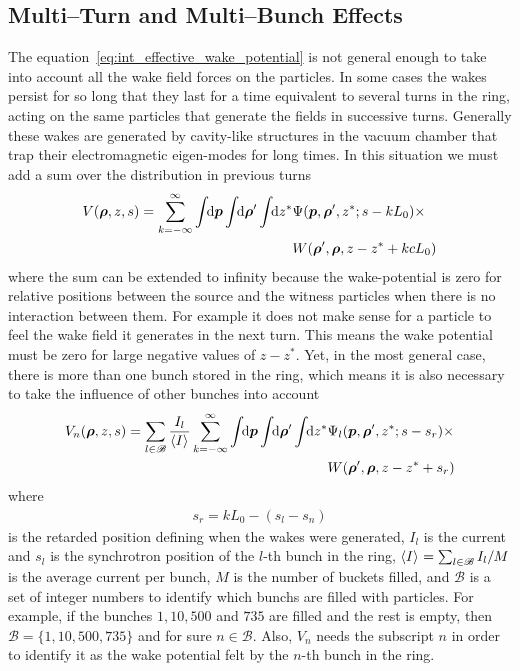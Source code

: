 \subsection{Multi--Turn and Multi--Bunch Effects}\label{ssec:multi_bunch_effects}

    The equation~\eqref{eq:int_effective_wake_potential} is not general enough to take into account all the wake field forces on the particles. In some cases the wakes persist for so long that they last for a time equivalent to several turns in the ring, acting on the same particles that generate the fields in successive turns. Generally these wakes are generated by cavity-like structures in the vacuum chamber that trap their electromagnetic eigen-modes for long times. In this situation we must add a sum over the distribution in previous turns
    \begin{align}\nonumber
  	  	V(\boldsymbol{\rho}, z, s) = \sum_{k=-\infty}^\infty\int\!\!\text{d}\boldsymbol{p} \int\!\!\text{d}\boldsymbol{\rho}' \int\!\!\text{d}z^* 
	  			&\Psi(\boldsymbol{p},\boldsymbol{\rho}',z^*; s-kL_0)\times\\ &W(\boldsymbol{\rho}',\boldsymbol{\rho},z-z^* + kcL_0)
    \end{align}
    where the sum can be extended to infinity because the wake-potential is zero for relative positions between the source and the witness particles when there is no interaction between them. For example it does not make sense for a particle to feel the wake field it generates in the next turn. This means the wake potential must be zero for large negative values of $z-z^*$. Yet, in the most general case, there is more than one bunch stored in the ring, which means it is also necessary to take the influence of other bunches into account
    \begin{align}\label{eq:general_eff_wake_pot}\nonumber
  	  	V_n(\boldsymbol{\rho}, z, s) = \sum_{l\in\mathscr{B}}\frac{I_l}{\left\langle I \right\rangle_{{}}}\sum_{k=-\infty}^\infty\int\!\!\text{d}\boldsymbol{p} \int\!\!\text{d}\boldsymbol{\rho}' \int\!\!\text{d}z^* 
	  			&\Psi_l(\boldsymbol{p},\boldsymbol{\rho}',z^*; s - s_r) \times\\
				&W(\boldsymbol{\rho}',\boldsymbol{\rho},z - z^* + s_r)
    \end{align}
    where
    \begin{align}\label{eq:retarded_time_definition}
        s_r = kL_0-(s_l-s_n)
    \end{align}
    is the retarded position defining when the wakes were generated, $I_l$ is the current and $s_l$ is the synchrotron position of the $l$-th bunch in the ring, $\left\langle I \right\rangle_{{}}=\sum_{l\in\mathscr{B}}I_l/M$ is the average current per bunch, $M$ is the number of buckets filled, and $\mathscr{B}$ is a set of integer numbers to identify which bunchs are filled with particles. For example, if the bunches $1, 10, 500$ and $735$ are filled and the rest is empty, then $\mathscr{B} = \{ 1, 10, 500, 735 \}$ and for sure $n\in\mathscr{B}$. Also, $V_n$ needs the subscript $n$ in order to identify it as the wake potential felt by the $n$-th bunch in the ring.

